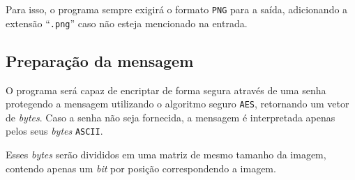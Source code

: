 \documentclass[brazilian,a4paper,twocolumn]{article}
\begin{document}
        Para isso, o programa sempre exigirá o formato \texttt{PNG} para a saída, adicionando a extensão ``\texttt{.png}'' caso não esteja mencionado na entrada.

    \subsection{Preparação da mensagem}

        O programa será capaz de encriptar de forma segura através de uma senha protegendo a mensagem utilizando o algoritmo seguro \texttt{AES}, retornando um vetor de \textit{bytes}. Caso a senha não seja fornecida, a mensagem é interpretada apenas pelos seus \textit{bytes} \texttt{ASCII}.

        Esses \textit{bytes} serão divididos em uma matriz de mesmo tamanho da imagem, contendo apenas um \textit{bit} por posição correspondendo a imagem.
\end{document}
